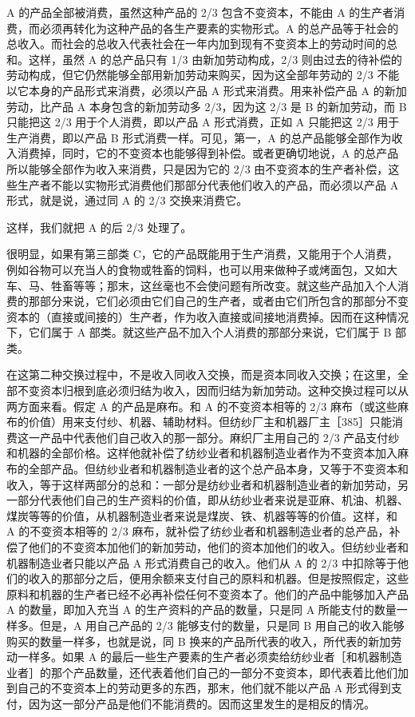 A 的产品全部被消费，虽然这种产品的 2/3 包含不变资本，不能由 A 的生产者消费，而必须再转化为这种产品的各生产要素的实物形式。A 的总产品等于社会的总收入。而社会的总收入代表社会在一年内加到现有不变资本上的劳动时间的总和。这样，虽然 A 的总产品只有 1/3 由新加劳动构成，2/3 则由过去的待补偿的劳动构成，但它仍然能够全部用新加劳动来购买，因为这全部年劳动的 2/3 不能以它本身的产品形式来消费，必须以产品 A 形式来消费。用来补偿产品 A 的新加劳动，比产品 A 本身包含的新加劳动多 2/3，因为这 2/3 是 B 的新加劳动，而 B 只能把这 2/3 用于个人消费，即以产品 A 形式消费，正如 A 只能把这 2/3 用于生产消费，即以产品 B 形式消费一样。可见，第一，A 的总产品能够全部作为收入消费掉，同时，它的不变资本也能够得到补偿。或者更确切地说，A 的总产品所以能够全部作为收入来消费，只是因为它的 2/3 由不变资本的生产者补偿，这些生产者不能以实物形式消费他们那部分代表他们收入的产品，而必须以产品 A 形式，就是说，通过同 A 的 2/3 交换来消费它。

这样，我们就把 A 的后 2/3 处理了。

很明显，如果有第三部类 C，它的产品既能用于生产消费，又能用于个人消费，例如谷物可以充当人的食物或牲畜的饲料，也可以用来做种子或烤面包，又如大车、马、牲畜等等；那末，这丝毫也不会使问题有所改变。就这些产品加入个人消费的那部分来说，它们必须由它们自己的生产者，或者由它们所包含的那部分不变资本的（直接或间接的）生产者，作为收入直接或间接地消费掉。因而在这种情况下，它们属于 A 部类。就这些产品不加入个人消费的那部分来说，它们属于 B 部类。

在这第二种交换过程中，不是收入同收入交换，而是资本同收入交换；在这里，全部不变资本归根到底必须归结为收入，因而归结为新加劳动。这种交换过程可以从两方面来看。假定 A 的产品是麻布。和 A 的不变资本相等的 2/3 麻布（或这些麻布的价值）用来支付纱、机器、辅助材料。但纺纱厂主和机器厂主［385］只能消费这一产品中代表他们自己收入的那一部分。麻织厂主用自己的 2/3 产品支付纱和机器的全部价格。这样他就补偿了纺纱业者和机器制造业者作为不变资本加入麻布的全部产品。但纺纱业者和机器制造业者的这个总产品本身，又等于不变资本和收入，等于这样两部分的总和：一部分是纺纱业者和机器制造业者的新加劳动，另一部分代表他们自己的生产资料的价值，即从纺纱业者来说是亚麻、机油、机器、煤炭等等的价值，从机器制造业者来说是煤炭、铁、机器等等的价值。这样，和 A 的不变资本相等的 2/3 麻布，就补偿了纺纱业者和机器制造业者的总产品，补偿了他们的不变资本加他们的新加劳动，他们的资本加他们的收入。但纺纱业者和机器制造业者只能以产品 A 形式消费自己的收入。他们从 A 的 2/3 中扣除等于他们的收入的那部分之后，便用余额来支付自己的原料和机器。但是按照假定，这些原料和机器的生产者已经不必再补偿任何不变资本了。他们的产品中能够加入产品 A 的数量，即加入充当 A 的生产资料的产品的数量，只是同 A 所能支付的数量一样多。但是，A 用自己产品的 2/3 能够支付的数量，只是同 B 用自己的收入能够购买的数量一样多，也就是说，同 B 换来的产品所代表的收入，所代表的新加劳动一样多。如果 A 的最后一些生产要素的生产者必须卖给纺纱业者［和机器制造业者］的那个产品数量，还代表着他们自己的一部分不变资本，即代表着比他们加到自己的不变资本上的劳动更多的东西，那末，他们就不能以产品 A 形式得到支付，因为这一部分产品是他们不能消费的。因而这里发生的是相反的情况。

